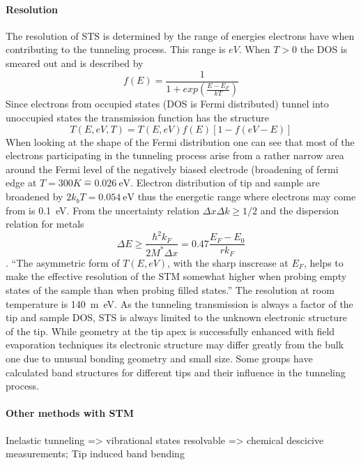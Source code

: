 \paragraph{Resolution}
The resolution of STS is determined by the range of energies electrons have when contributing to the tunneling process. This range is $eV$. When $T>0$ the DOS is smeared out and is described by $$f(E)=\frac{1}{1+exp\left(\frac{E-E_F}{kT}\right)}$$ 
Since electrons from occupied states (DOS is Fermi distributed) tunnel into unoccupied states the transmission function has the structure $$T(E,eV,T)=T(E,eV)f(E)[1-f(eV-E)]$$ 
When looking at the shape of the Fermi distribution one can see that most of the electrons participating in the tunneling process arise from a rather narrow area around the Fermi level of the negatively biased electrode (broadening of fermi edge at $T=300K\hat=\SI{0.026}{\eV}$. Electron distribution of tip and sample are broadened by $2 k_b T=\SI{0.054}{\eV}$ thus the energetic range where electrons may come from is \SI{0.1}{\eV}. From the uncertainty relation $\Delta x \Delta k \geq 1/2$ and the dispersion relation for metals $$ \Delta E\ge \frac{\hbar^2k_F}{2M^*\Delta x}=0.47\frac{E_F-E_0}{rk_F} $$\cite{chen_introduction_2008}. ``The asymmetric form of $T(E,eV)$, with the sharp inscrease at $E_F$, helps to make the effective resolution of the STM somewhat higher when probing empty states of the sample than when probing filled states.''
The resolution at room temperature is \SI{140}{\m\eV}\cite{hansma_tunneling_1982}.
As the tunneling transmission is always a factor of the tip and sample DOS, STS is always limited to the unknown electronic structure of the tip. While geometry at the tip apex is successfully enhanced with field evaporation techniques its electronic structure may differ greatly from the bulk one due to unusual bonding geometry and small size. Some\cite{tersoff_role_1990,ciraci_tip-sample_1990,lawunmi_theoretical_1990,kobayashi_simulation_1990} groups have calculated band structures for different tips and their influence in the tunneling process.


\paragraph{Other methods with STM}Inelastic tunneling => vibrational states resolvable => chemical descicive measurements; Tip induced band bending

